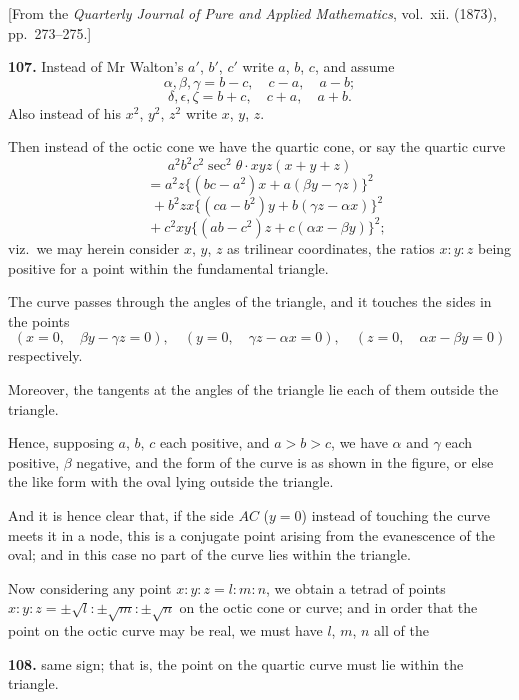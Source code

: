 \documentclass[11pt,a4paper]{article}
\theoremstyle{plain}
\begin{document}
\begin{flushright}
\small[From the \textit{Quarterly Journal of Pure and Applied Mathematics}, vol.~xii. (1873), pp.~273--275.]
\end{flushright}

\noindent\textbf{107.} Instead of Mr Walton's $a'$, $b'$, $c'$ write $a$, $b$, $c$, and assume
\[
\alpha, \beta, \gamma = b - c, \quad c - a, \quad a - b;
\]
\[
\delta, \epsilon, \zeta = b + c, \quad c + a, \quad a + b.
\]
Also instead of his $x^2$, $y^2$, $z^2$ write $x$, $y$, $z$.

Then instead of the octic cone we have the quartic cone, or say the quartic curve
\[
a^2b^2c^2\sec^2\theta\cdot xyz(x + y + z)
\]
\[
= a^2z\{(bc - a^2)x + a(\beta y - \gamma z)\}^2
\]
\[
\quad {}+ b^2zx\{(ca - b^2)y + b(\gamma z - \alpha x)\}^2
\]
\[
\quad {}+ c^2xy\{(ab - c^2)z + c(\alpha x - \beta y)\}^2;
\]
viz.\ we may herein consider $x$, $y$, $z$ as trilinear coordinates, the ratios $x : y : z$ being positive for a point within the fundamental triangle.

The curve passes through the angles of the triangle, and it touches the sides in the points
\[
(x = 0, \quad \beta y - \gamma z = 0), \quad (y = 0, \quad \gamma z - \alpha x = 0), \quad (z = 0, \quad \alpha x - \beta y = 0)
\]
respectively.

Moreover, the tangents at the angles of the triangle lie each of them outside the triangle.

Hence, supposing $a$, $b$, $c$ each positive, and $a > b > c$, we have $\alpha$ and $\gamma$ each positive, $\beta$ negative, and the form of the curve is as shown in the figure, or else the like form with the oval lying outside the triangle.

And it is hence clear that, if the side $AC$ ($y = 0$) instead of touching the curve meets it in a node, this is a conjugate point arising from the evanescence of the oval; and in this case no part of the curve lies within the triangle.

Now considering any point $x : y : z = l : m : n$, we obtain a tetrad of points $x : y : z = \pm\sqrt{l} : \pm\sqrt{m} : \pm\sqrt{n}$ on the octic cone or curve; and in order that the point on the octic curve may be real, we must have $l$, $m$, $n$ all of the

\noindent\textbf{108.} same sign; that is, the point on the quartic curve must lie within the triangle.
\end{document}
